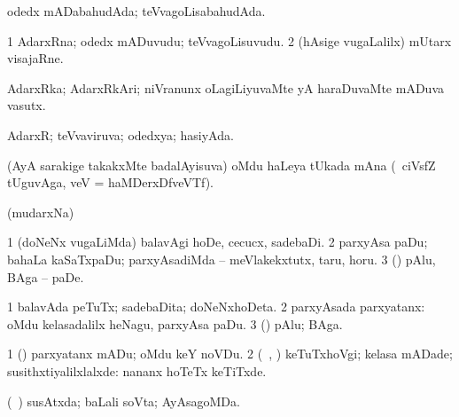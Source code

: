 \bentry
{} 
\gl{\gu}
\expl{}
\bmng
odedx mADabahudAda; teVvagoLisabahudAda. 
\emng
\eentry

\bentry
{} 
\gl{\nA}
\expl{}
\bmng
\bnum
\num{1} AdarxRna; odedx mADuvudu; teVvagoLisuvudu. 
\num{2} (hAsige \mo vugaLalilx) mUtarx visajaRne. 
\enum
\emng
\eentry

\bentry
{} 
\gl{\nA}
\expl{}
\bmng
AdarxRka; AdarxRkAri; niVranunx oLagiLiyuvaMte yA haraDuvaMte mADuva vasutx. 
\emng
\eentry

\bentry
{} 
\gl{\gu}
\expl{}
\bmng
AdarxR; teVvaviruva; odedxya; hasiyAda. 
\emng
\eentry

\bentry
{} 
\bmng
{} 
\emng
\eentry

\bentry 
{} 
\gl{\nA}
\expl{}
\bmng
(AyA sarakige takakxMte badalAyisuva) oMdu haLeya tUkada mAna (\udA\ ciVsfZ tUguvAga,  veV =  haMDerxDfveVTf). 
\emng
\eentry

\bentry
{} 
\gl{\saMkiSx}
\expl{}
\bmng
(mudarxNa)  
\emng
\eentry

\bentry
{} 
\gl{\saMkiSx}
\expl{}
\bmng
{} 
\emng
\eentry

\bentry
{} 
\gl{\saMkiSx}
\expl{}
\bmng
{} 
\emng
\eentry

\bentry
{} 
\gl{\sakirx}
\expl{}
\bmng
\bnum
\num{1} (doNeNx \mo vugaLiMda) balavAgi hoDe, cecucx, sadebaDi. 
\num{2} parxyAsa paDu; bahaLa kaSaTxpaDu; parxyAsadiMda -- meVlakekxtutx, taru, horu. 
\num{3} (\ashi) pAlu, BAga -- paDe. 
\enum
\emng
\eentry

\bentry
{} 
\gl{\nA}
\expl{}
\bmng
\bnum
\num{1} balavAda peTuTx; sadebaDita; doNeNxhoDeta. 
\num{2} parxyAsada parxyatanx:  oMdu kelasadalilx heNagu, parxyAsa paDu. 
\num{3} (\ashi) pAlu; BAga. 
\enum
\emng

\noindent 
\gl{\pagu}
\expl{}
\bmng
\bnum
\num{1}  (\ashi) parxyatanx mADu; oMdu keY noVDu. 
\num{2}  (\kanmu\ \ame, \ashi) keTuTxhoVgi; kelasa mADade; susithxtiyalilxlalxde:  nananx hoTeTx keTiTxde. 
\enum
\emng
\eentry

\bentry
{} 
\gl{\gu}
\expl{}
\bmng
(\kanmu\ \birx) susAtxda; baLali soVta; AyAsagoMDa. 
\emng
\eentry

